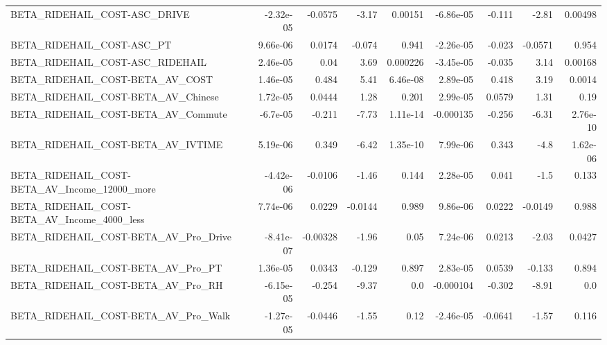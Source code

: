 \begin{tabular}{lrrrrrrrr}
BETA\_RIDEHAIL\_COST-ASC\_DRIVE                       &   -2.32e-05 &      -0.0575 &     -3.17 &  0.00151 &  -6.86e-05 &      -0.111 &        -2.81 &       0.00498 \\
BETA\_RIDEHAIL\_COST-ASC\_PT                          &    9.66e-06 &       0.0174 &    -0.074 &    0.941 &  -2.26e-05 &      -0.023 &      -0.0571 &         0.954 \\
BETA\_RIDEHAIL\_COST-ASC\_RIDEHAIL                    &    2.46e-05 &         0.04 &      3.69 & 0.000226 &  -3.45e-05 &      -0.035 &         3.14 &       0.00168 \\
BETA\_RIDEHAIL\_COST-BETA\_AV\_COST                    &    1.46e-05 &        0.484 &      5.41 & 6.46e-08 &   2.89e-05 &       0.418 &         3.19 &        0.0014 \\
BETA\_RIDEHAIL\_COST-BETA\_AV\_Chinese                 &    1.72e-05 &       0.0444 &      1.28 &    0.201 &   2.99e-05 &      0.0579 &         1.31 &          0.19 \\
BETA\_RIDEHAIL\_COST-BETA\_AV\_Commute                 &    -6.7e-05 &       -0.211 &     -7.73 & 1.11e-14 &  -0.000135 &      -0.256 &        -6.31 &      2.76e-10 \\
BETA\_RIDEHAIL\_COST-BETA\_AV\_IVTIME                  &    5.19e-06 &        0.349 &     -6.42 & 1.35e-10 &   7.99e-06 &       0.343 &         -4.8 &      1.62e-06 \\
BETA\_RIDEHAIL\_COST-BETA\_AV\_Income\_12000\_more       &   -4.42e-06 &      -0.0106 &     -1.46 &    0.144 &   2.28e-05 &       0.041 &         -1.5 &         0.133 \\
BETA\_RIDEHAIL\_COST-BETA\_AV\_Income\_4000\_less        &    7.74e-06 &       0.0229 &   -0.0144 &    0.989 &   9.86e-06 &      0.0222 &      -0.0149 &         0.988 \\
BETA\_RIDEHAIL\_COST-BETA\_AV\_Pro\_Drive               &   -8.41e-07 &     -0.00328 &     -1.96 &     0.05 &   7.24e-06 &      0.0213 &        -2.03 &        0.0427 \\
BETA\_RIDEHAIL\_COST-BETA\_AV\_Pro\_PT                  &    1.36e-05 &       0.0343 &    -0.129 &    0.897 &   2.83e-05 &      0.0539 &       -0.133 &         0.894 \\
BETA\_RIDEHAIL\_COST-BETA\_AV\_Pro\_RH                  &   -6.15e-05 &       -0.254 &     -9.37 &      0.0 &  -0.000104 &      -0.302 &        -8.91 &           0.0 \\
BETA\_RIDEHAIL\_COST-BETA\_AV\_Pro\_Walk                &   -1.27e-05 &      -0.0446 &     -1.55 &     0.12 &  -2.46e-05 &     -0.0641 &        -1.57 &         0.116 \\

\end{tabular}
